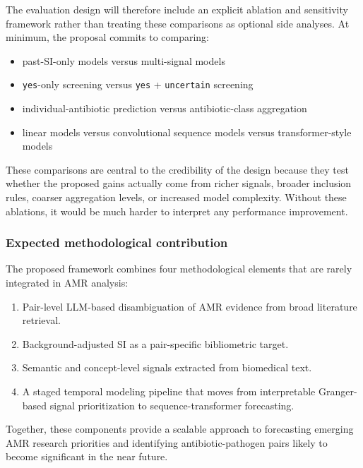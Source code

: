 \documentclass[
]{article}
\providecommand{\tightlist}{%
  \setlength{\itemsep}{0pt}\setlength{\parskip}{0pt}}
\begin{document}
The evaluation design will therefore include an explicit ablation and
sensitivity framework rather than treating these comparisons as optional
side analyses. At minimum, the proposal commits to comparing:

\begin{itemize}
\tightlist
\item
  past-SI-only models versus multi-signal models
\item
  \texttt{yes}-only screening versus \texttt{yes} +
  \texttt{uncertain} screening
\item
  individual-antibiotic prediction versus antibiotic-class aggregation
\item
  linear models versus convolutional sequence models versus
  transformer-style models
\end{itemize}

These comparisons are central to the credibility of the design because
they test whether the proposed gains actually come from richer signals,
broader inclusion rules, coarser aggregation levels, or increased model
complexity. Without these ablations, it would be much harder to
interpret any performance improvement.

\subsubsection{Expected methodological
contribution}\label{expected-methodological-contribution}

The proposed framework combines four methodological elements that are
rarely integrated in AMR analysis:

\begin{enumerate}
\def\labelenumi{\arabic{enumi}.}
\tightlist
\item
  Pair-level LLM-based disambiguation of AMR evidence from broad
  literature retrieval.
\item
  Background-adjusted SI as a pair-specific bibliometric target.
\item
  Semantic and concept-level signals extracted from biomedical text.
\item
  A staged temporal modeling pipeline that moves from interpretable
  Granger-based signal prioritization to sequence-transformer
  forecasting.
\end{enumerate}

Together, these components provide a scalable approach to forecasting
emerging AMR research priorities and identifying antibiotic-pathogen
pairs likely to become significant in the near future.
\end{document}
